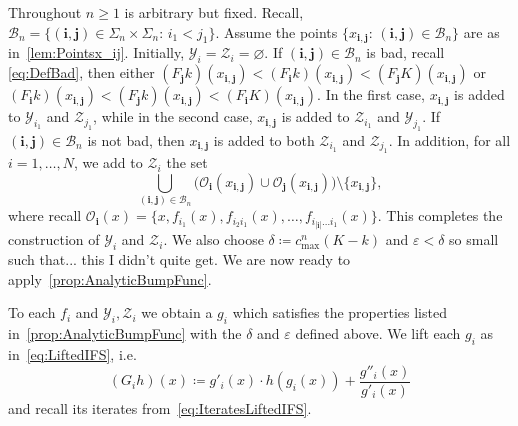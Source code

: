 \documentclass[12pt,]{article}
\theoremstyle{definition}
\theoremstyle{remark}
\newcommand{\0}{\mathbf{0}}
\newcommand{\bi}{\mathbf{i}}
\newcommand{\bj}{\mathbf{j}}
\begin{document}
{Throughout $n\geq 1$ is arbitrary but fixed. Recall, $\mathcal{B}_n=\{(\bi,\bj)\in\Sigma_n\times\Sigma_n:\, i_1<j_1\}$. Assume the points $\{x_{\bi,\bj}:\, (\bi,\bj)\in\mathcal{B}_n\}$ are as in~\cref{lem:Pointsx_ij}. Initially, $\mathcal{Y}_i=\mathcal{Z}_i=\varnothing$. If $(\bi,\bj)\in\mathcal{B}_n$ is bad, recall \cref{eq:DefBad}, then either $(F_{\bj}k)(x_{\bi,\bj})< (F_{\bi}k)(x_{\bi,\bj})<(F_{\bj}K)(x_{\bi,\bj})$ or $(F_{\bi}k)(x_{\bi,\bj})< (F_{\bj}k)(x_{\bi,\bj})<(F_{\bi}K)(x_{\bi,\bj})$. In the first case, $x_{\bi,\bj}$ is added to $\mathcal{Y}_{i_1}$ and $\mathcal{Z}_{j_1}$, while in the second case, $x_{\bi,\bj}$ is added to $\mathcal{Z}_{i_1}$ and $\mathcal{Y}_{j_1}$. If $(\bi,\bj)\in\mathcal{B}_n$ is not bad, then $x_{\bi,\bj}$ is added to both $\mathcal{Z}_{i_1}$ and $\mathcal{Z}_{j_1}$. In addition, for all $i=1,\ldots,N$, we add to $\mathcal{Z}_i$ the set
\begin{equation*}
\bigcup_{(\bi,\bj)\in\mathcal{B}_n} \big(\mathcal{O}_{\bi}(x_{\bi,\bj})\cup \mathcal{O}_{\bj}(x_{\bi,\bj})\big)\setminus\{x_{\bi,\bj}\},
\end{equation*}
where recall $\mathcal{O}_{\bi}(x)= \{x,f_{i_1}(x), f_{i_2i_1}(x),\ldots,f_{i_{|\bi|}\ldots i_1}(x)\}$. This completes the construction of $\mathcal{Y}_i$ and $\mathcal{Z}_i$. We also choose $\delta\coloneqq c_{\max}^n(K-k)$ and $\varepsilon<\delta$ so small such that... {\color{red}this I didn't quite get.} We are now ready to apply~\cref{prop:AnalyticBumpFunc}.

To each $f_i$ and $\mathcal{Y}_i, \mathcal{Z}_i$ we obtain a $g_i$ which satisfies the properties listed in~\cref{prop:AnalyticBumpFunc} with the $\delta$ and $\varepsilon$ defined above. We lift each $g_i$ as in~\cref{eq:LiftedIFS}, i.e. 
\begin{equation*}
(G_ih)(x)\coloneqq g'_i(x)\cdot h(g_i(x)) + \frac{g''_i(x)}{g'_i(x)}
\end{equation*}
and recall its iterates from~\eqref{eq:IteratesLiftedIFS}.

}
\end{document}
